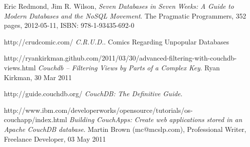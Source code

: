 \renewcommand\bibname{References}

\begin{thebibliography}{9}

  Eric Redmond, Jim R. Wilson,
  \emph{Seven Databases in Seven Weeks: A Guide to Modern Databases and the NoSQL Movement}.
  The Pragmatic Programmers,
  352 pages, 2012-05-11, 
  ISBN: 978-1-93435-692-0
  
  http://crudcomic.com/
  \emph{C.R.U.D.}.
  Comics Regarding Unpopular Databases
  
  http://ryankirkman.github.com/2011/03/30/advanced-filtering-with-couchdb-views.html
  \emph{Couchdb – Filtering Views by Parts of a Complex Key}.
  Ryan Kirkman, 30 Mar 2011

  http://guide.couchdb.org/
  \emph{CouchDB: The Definitive Guide}.  
  
  http://www.ibm.com/developerworks/opensource/tutorials/os-couchapp/index.html
  \emph{Building CouchApps: Create web applications stored in an Apache CouchDB database}.
  Martin Brown (mc@mcslp.com), Professional Writer, Freelance Developer, 
  03 May 2011

\end{thebibliography}